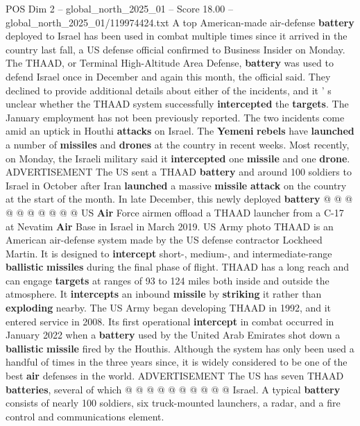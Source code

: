 \begin{textsample}{POS Dim 2 – global\_north\_2025\_01 – Score 18.00 – global\_north\_2025\_01/119974424.txt}  \label{ex:f2_pos_397}
A top American-made air-defense \textbf{battery} deployed to Israel has been used in combat multiple times since it arrived in the country last fall, a US defense official confirmed to Business Insider on Monday.
The THAAD, or Terminal High-Altitude Area Defense, \textbf{battery} was used to defend Israel once in December and again this month, the official said.
They declined to provide additional details about either of the incidents, and it ' s unclear whether the THAAD system successfully \textbf{intercepted} the \textbf{targets}.
The January employment has not been previously reported.
The two incidents come amid an uptick in Houthi \textbf{attacks} on Israel.
The \textbf{Yemeni} \textbf{rebels} have \textbf{launched} a number of \textbf{missiles} and \textbf{drones} at the country in recent weeks.
Most recently, on Monday, the Israeli military said it \textbf{intercepted} one \textbf{missile} and one \textbf{drone}.
ADVERTISEMENT The US sent a THAAD \textbf{battery} and around 100 soldiers to Israel in October after Iran \textbf{launched} a massive \textbf{missile} \textbf{attack} on the country at the start of the month.
In late December, this newly deployed \textbf{battery} @ @ @ @ @ @ @ @ @ @ US \textbf{Air} Force airmen offload a THAAD launcher from a C-17 at Nevatim \textbf{Air} Base in Israel in March 2019.
US Army photo THAAD is an American air-defense system made by the US defense contractor Lockheed Martin.
It is designed to \textbf{intercept} short-, medium-, and intermediate-range \textbf{ballistic} \textbf{missiles} during the final phase of flight.
THAAD has a long reach and can engage \textbf{targets} at ranges of 93 to 124 miles both inside and outside the atmosphere.
It \textbf{intercepts} an inbound \textbf{missile} by \textbf{striking} it rather than \textbf{exploding} nearby.
The US Army began developing THAAD in 1992, and it entered service in 2008.
Its first operational \textbf{intercept} in combat occurred in January 2022 when a \textbf{battery} used by the United Arab Emirates shot down a \textbf{ballistic} \textbf{missile} fired by the Houthis.
Although the system has only been used a handful of times in the three years since, it is widely considered to be one of the best \textbf{air} defenses in the world.
ADVERTISEMENT The US has seven THAAD \textbf{batteries}, several of which @ @ @ @ @ @ @ @ @ @ Israel.
A typical \textbf{battery} consists of nearly 100 soldiers, six truck-mounted launchers, a radar, and a fire control and communications element.

\end{textsample}
